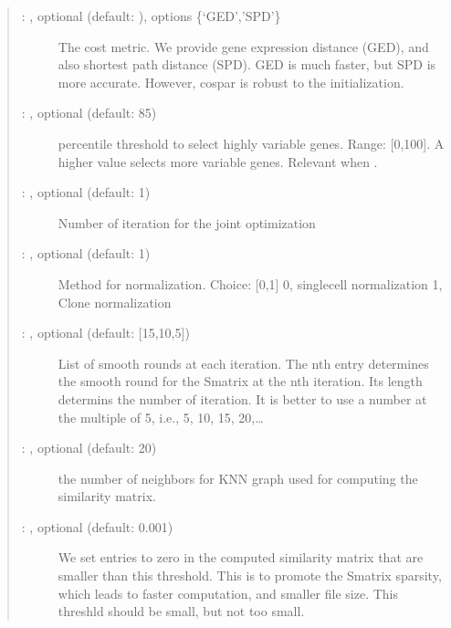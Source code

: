 \documentclass[letterpaper,10pt,english]{sphinxmanual}
\begin{document}
\begin{fulllineitems}
\begin{quote}
\begin{description}
\begin{description}
\item[{ : , optional (default: ), options \{‘GED’,’SPD’\}}] \leavevmode
The cost metric. We provide gene expression distance (GED), and also
shortest path distance (SPD). GED is much faster, but SPD is more accurate.
However, cospar is robust to the initialization.

\item[{ : , optional (default: 85)}] \leavevmode
percentile threshold to select highly variable genes. Range: {[}0,100{]}.
A higher value selects more variable genes.
Relevant when .

\item[{ : , optional (default: 1)}] \leavevmode
Number of iteration for the joint optimization

\item[{ : , optional (default: 1)}] \leavevmode
Method for normalization. Choice: {[}0,1{]}
0, single\sphinxhyphen{}cell normalization
1, Clone normalization

\item[{ : , optional (default: {[}15,10,5{]})}] \leavevmode
List of smooth rounds at each iteration.
The n\sphinxhyphen{}th entry determines the smooth round for the Smatrix
at the n\sphinxhyphen{}th iteration. Its length determins the number of
iteration. It is better to use a number at the multiple of
5, i.e., 5, 10, 15, 20,…

\item[{ : , optional (default: 20)}] \leavevmode
the number of neighbors for KNN graph used for computing the similarity matrix.

\item[{ : , optional (default: 0.001)}] \leavevmode
We set entries to zero in the computed similarity matrix that
are smaller than this threshold. This is to promote the Smatrix sparsity, which
leads to faster computation, and smaller file size.
This threshld should be small, but not too small.


\end{description}
\end{description}
\end{quote}
\end{fulllineitems}
\end{document}
